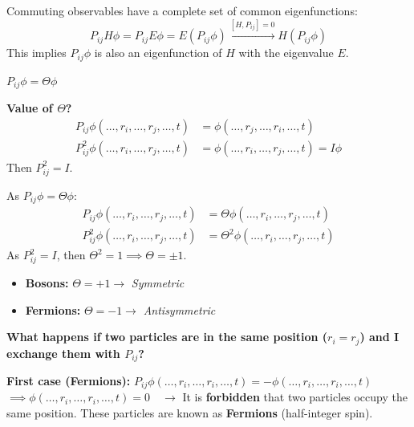 \documentclass[12pt,a4paper]{report}
\newcommand{\esp}{\vspace{0.5cm}}
\begin{document}
	\esp
	
	Commuting observables have a complete set of common eigenfunctions:
	\begin{equation}
		P_{ij} H \phi = P_{ij} E \phi = E (P_{ij} \phi) \xrightarrow{[H, P_{ij}]=0} H (P_{ij} \phi)
	\end{equation}
	This implies $P_{ij} \phi$ is also an eigenfunction of $H$ with the eigenvalue $E$.
	
	\esp
	
	$P_{ij} \phi = \Theta \phi$
	
	\esp
	
	\textbf{Value of $\Theta$?}
	\begin{align*}
		P_{ij} \phi(\dots, r_i, \dots, r_j, \dots, t) &= \phi(\dots, r_j, \dots, r_i, \dots, t) \\
		P_{ij}^2 \phi(\dots, r_i, \dots, r_j, \dots, t) &= \phi(\dots, r_i, \dots, r_j, \dots, t) = I \phi
	\end{align*}
	Then $P_{ij}^2 = I$.
	
	\esp
	
	As $P_{ij} \phi = \Theta \phi$:
	\begin{align*}
		P_{ij} \phi(\dots, r_i, \dots, r_j, \dots, t) &= \Theta \phi(\dots, r_i, \dots, r_j, \dots, t) \\
		P_{ij}^2 \phi(\dots, r_i, \dots, r_j, \dots, t) &= \Theta^2 \phi(\dots, r_i, \dots, r_j, \dots, t)
	\end{align*}
	As $P_{ij}^2 = I$, then $\Theta^2 = 1 \implies \Theta = \pm 1$.
	
	\esp
	
	\begin{itemize}
		\item \textbf{Bosons:} $\Theta = +1 \to$ \textit{Symmetric}
		\item \textbf{Fermions:} $\Theta = -1 \to$ \textit{Antisymmetric}
	\end{itemize}
	
	\esp
	
	\textbf{What happens if two particles are in the same position ($r_i = r_j$) and I exchange them with $P_{ij}$?}
	
	\esp
	
	\textbf{First case (Fermions):} $P_{ij} \phi(\dots, r_i, \dots, r_i, \dots, t) = -\phi(\dots, r_i, \dots, r_i, \dots, t)$ \\
	$\implies \phi(\dots, r_i, \dots, r_i, \dots, t) = 0 \quad \to$ It is \textbf{forbidden} that two particles occupy the same position. These particles are known as \textbf{Fermions} (half-integer spin).
	
\end{document}
